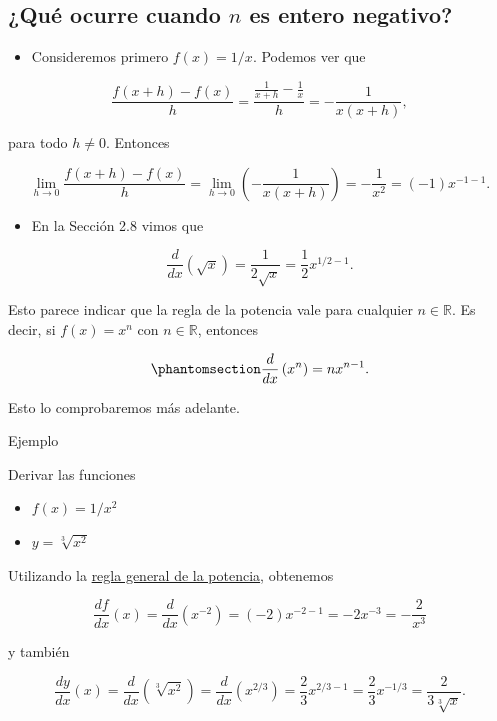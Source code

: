 \documentclass[
  letterpaper,
]{book}
\providecommand{\tightlist}{%
  \setlength{\itemsep}{0pt}\setlength{\parskip}{0pt}}
\theoremstyle{plain}
\theoremstyle{remark}
\begin{document}
\subsection{\texorpdfstring{¿Qué ocurre cuando \(n\) es entero
negativo?}{¿Qué ocurre cuando n es entero negativo?}}\label{quuxe9-ocurre-cuando-n-es-entero-negativo}

\begin{itemize}
\tightlist
\item
  Consideremos primero \(f(x)=1/x\). Podemos ver que
\end{itemize}

\[
\frac{f(x+h)-f(x)}{h}=\frac{\frac{1}{x+h}-\frac{1}{x}}{h}=-\frac{1}{x(x+h)},
\]

para todo \(h\neq 0\). Entonces

\[
\lim_{h\to 0}\frac{f(x+h)-f(x)}{h}=\lim_{h\to 0}\left(-\frac{1}{x(x+h)}\right)=-\frac{1}{x^2}=(-1)x^{-1-1}.
\]

\begin{itemize}
\tightlist
\item
  En la Sección 2.8 vimos que
\end{itemize}

\[
\frac{d}{dx}\left(\sqrt{x}\right)=\frac{1}{2\sqrt{x}}=\frac{1}{2}x^{1/2-1}.
\]

Esto parece indicar que la regla de la potencia vale para cualquier
\(n\in\mathbb{R}\). Es decir, si \(f(x)=x^n\) con \(n\in\mathbb{R}\),
entonces

\begin{equation}\phantomsection\label{eq-potencia-general}{
\frac{d}{dx}\left(x^n\right)=nx^{n-1}.
}\end{equation}

Esto lo comprobaremos más adelante.

Ejemplo

Derivar las funciones

\begin{itemize}
\tightlist
\item
  \(f(x)=1/x^2\)
\item
  \(y=\sqrt[3]{x^2}\)
\end{itemize}

\begin{tcolorbox}[enhanced jigsaw, opacityback=0, left=2mm, opacitybacktitle=0.6, toprule=.15mm, bottomrule=.15mm, colbacktitle=quarto-callout-tip-color!10!white, titlerule=0mm, bottomtitle=1mm, title=\textcolor{quarto-callout-tip-color}{\faLightbulb}\hspace{0.5em}{Solución}, toptitle=1mm, colframe=quarto-callout-tip-color-frame, colback=white, breakable, rightrule=.15mm, arc=.35mm, leftrule=.75mm, coltitle=black]

Utilizando la \hyperref[eq-potencia-general]{regla general de la
potencia}, obtenemos

\[
\frac{df}{dx}(x)=\frac{d}{dx}\left(x^{-2}\right)=(-2)x^{-2-1}=-2x^{-3}=-\frac{2}{x^3}
\]

y también

\[
\frac{dy}{dx}(x)=\frac{d}{dx}\left(\sqrt[3]{x^2}\right)=\frac{d}{dx}\left(x^{2/3}\right)=\frac{2}{3}x^{2/3-1}=\frac{2}{3}x^{-1/3}=\frac{2}{3 \sqrt[3]{x}}.
\]

\end{tcolorbox}
\end{document}
